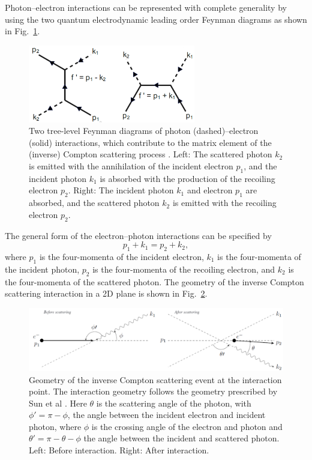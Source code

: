 \documentclass[../main.tex]{subfiles}
\begin{document}
Photon--electron interactions can be represented with complete generality by using the two quantum electrodynamic leading order Feynman diagrams as shown in Fig.~\ref{fig:ICS_Feynman_diagrams}. 
\begin{figure}[!h]
\centering
\includegraphics[width=0.65\textwidth]{Figures/Photon_Production_by_Inverse_Compton_Scattering/ICS_feynman_fixed.pdf}
\caption{Two tree-level Feynman diagrams of photon (dashed)--electron (solid) interactions, which contribute to the matrix element of the (inverse) Compton scattering process \cite{berestetskii1982quantum}. Left: The scattered photon $k_{2}$ is emitted with the annihilation of the incident electron $p_{1}$, and the incident photon $k_{1}$ is absorbed with the production of the recoiling electron $p_{2}$. Right: The incident photon $k_{1}$ and electron $p_{1}$ are absorbed, and the scattered photon $k_{2}$ is emitted with the recoiling electron $p_{2}$.}
\label{fig:ICS_Feynman_diagrams}
\end{figure}
The general form of the electron--photon interactions can be specified by
\begin{equation}
p_{1} + k_{1} = p_{2} + k_{2},
\label{eq:ICS_process}
\end{equation}
where $p_{1}$ is the four-momenta of the incident electron, $k_{1}$ is the four-momenta of the incident photon, $p_{2}$ is the four-momenta of the recoiling electron, and $k_{2}$ is the four-momenta of the scattered photon. The geometry of the inverse Compton scattering interaction in a 2D plane is shown in Fig.~\ref{fig:scattered_photon_kinematics}.
\begin{figure}[!h]
\centering
\includegraphics[width=\textwidth]{Figures/Photon_Production_by_Inverse_Compton_Scattering/scatteringkinematicsdiagram.pdf}
\caption{Geometry of the inverse Compton scattering event at the interaction point. The interaction geometry follows the geometry prescribed by Sun et al \cite{sun2009energy}. Here $\theta$ is the scattering angle of the photon, with $\phi' = \pi -\phi$, the angle between the incident electron and incident photon, where $\phi$ is the crossing angle of the electron and photon and $\theta' = \pi - \theta - \phi$ the angle between the incident and scattered photon. Left: Before interaction. Right: After interaction.}
\label{fig:scattered_photon_kinematics}
\end{figure}
\end{document}

